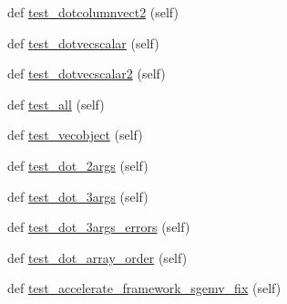 \begin{DoxyCompactItemize}
\item 
def \hyperlink{classnumpy_1_1core_1_1tests_1_1test__multiarray_1_1TestDot_a48c743498999dee52ba23616611cb961}{test\+\_\+dotcolumnvect2} (self)
\item 
def \hyperlink{classnumpy_1_1core_1_1tests_1_1test__multiarray_1_1TestDot_a8c7839612a936a6ca18273f63bfd462e}{test\+\_\+dotvecscalar} (self)
\item 
def \hyperlink{classnumpy_1_1core_1_1tests_1_1test__multiarray_1_1TestDot_ab7f0db7504f8beb8776806db41b73ba2}{test\+\_\+dotvecscalar2} (self)
\item 
def \hyperlink{classnumpy_1_1core_1_1tests_1_1test__multiarray_1_1TestDot_af5d570909c60efa364c2331bb42e5aa8}{test\+\_\+all} (self)
\item 
def \hyperlink{classnumpy_1_1core_1_1tests_1_1test__multiarray_1_1TestDot_ae8bb55cec8bfcfb0f591bc2149fd15c1}{test\+\_\+vecobject} (self)
\item 
def \hyperlink{classnumpy_1_1core_1_1tests_1_1test__multiarray_1_1TestDot_a783f05a22a162196d82a895359e21957}{test\+\_\+dot\+\_\+2args} (self)
\item 
def \hyperlink{classnumpy_1_1core_1_1tests_1_1test__multiarray_1_1TestDot_a4fd62f3e692cfa7afff37f765ec0ec27}{test\+\_\+dot\+\_\+3args} (self)
\item 
def \hyperlink{classnumpy_1_1core_1_1tests_1_1test__multiarray_1_1TestDot_aafbbadd86f2c3608db77aa26f36f293c}{test\+\_\+dot\+\_\+3args\+\_\+errors} (self)
\item 
def \hyperlink{classnumpy_1_1core_1_1tests_1_1test__multiarray_1_1TestDot_a2ffb885c461df30cafdda08c10cfce06}{test\+\_\+dot\+\_\+array\+\_\+order} (self)
\item 
def \hyperlink{classnumpy_1_1core_1_1tests_1_1test__multiarray_1_1TestDot_ae0d242316362ab9c1fb601b95639987b}{test\+\_\+accelerate\+\_\+framework\+\_\+sgemv\+\_\+fix} (self)
\end{DoxyCompactItemize}
